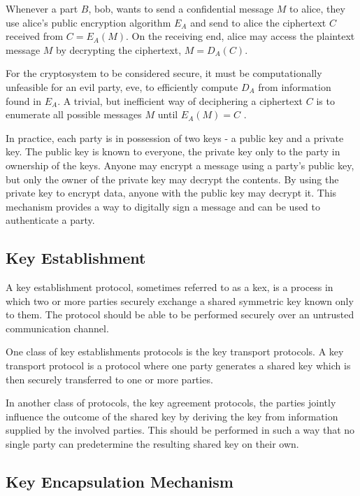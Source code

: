 Whenever a part $B$, \gls{bob}, wants to send a confidential message $M$ to \gls{alice}, they use \gls{alice}'s public encryption algorithm $E_A$ and send to \gls{alice} the ciphertext $C$ received from $C=E_A(M)$. On the receiving end, \gls{alice} may access the plaintext message $M$ by decrypting the ciphertext, $M=D_A(C)$\cite{rsa1977}.

For the cryptosystem to be considered secure, it must be computationally unfeasible for an evil party, \gls{eve}, to efficiently compute $D_A$ from information found in $E_A$. A trivial, but inefficient way of deciphering a ciphertext $C$ is to enumerate all possible messages $M$ until $E_A(M)=C$ \cite{rsa1977}.

In practice, each party is in possession of two keys - a public key and a private key. The public key is known to everyone, the private key only to the party in ownership of the keys. Anyone may encrypt a message using a party's public key, but only the owner of the private key may decrypt the contents. By using the private key to encrypt data, anyone with the public key may decrypt it. This mechanism provides a way to digitally sign a message and can be used to authenticate a party\cite{bernstein2017}.

\subsection{Key Establishment}

A key establishment protocol, sometimes referred to as a \gls{kex}, is a process in which two or more parties securely exchange a shared symmetric key known only to them. The protocol should be able to be performed securely over an untrusted communication channel\cite{boyd2020}.

One class of key establishments protocols is the key transport protocols. A key transport protocol is a protocol where one party generates a shared key which is then securely transferred to one or more parties\cite{boyd2020}.

In another class of protocols, the key agreement protocols, the parties jointly influence the outcome of the shared key by deriving the key from information supplied by the involved parties. This should be performed in such a way that no single party can predetermine the resulting shared key on their own\cite{boyd2020}.

\subsection{Key Encapsulation Mechanism}

